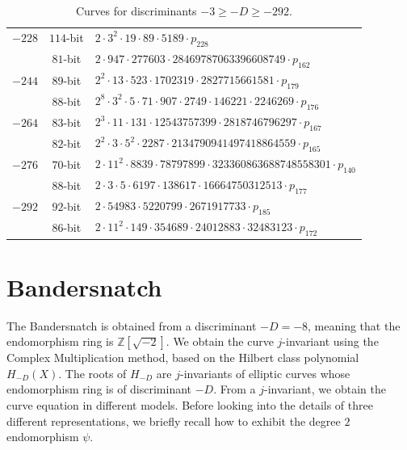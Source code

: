 \documentclass{article}
\newcommand{\Z}{\ensuremath{\mathbb Z}}
\theoremstyle{definition}
\begin{document}
\begin{table}[!ht]
\begin{tabularx}{\textwidth}{ccl}
$-228$ & $114$-bit & $2  \cdot 3^{2}  \cdot 19  \cdot 89  \cdot 5189  \cdot p_{228}$\\
 & $81$-bit & $2  \cdot 947  \cdot 277603  \cdot 28469787063396608749  \cdot p_{162}$\\
$-244$ & $89$-bit & $2^{2}  \cdot 13  \cdot 523  \cdot 1702319  \cdot 2827715661581  \cdot p_{179}$\\
 & $88$-bit & $2^{8}  \cdot 3^{2}  \cdot 5  \cdot 71  \cdot 907  \cdot 2749  \cdot 146221  \cdot 2246269  \cdot p_{176}$\\
$-264$ & $83$-bit & $2^{3}  \cdot 11  \cdot 131  \cdot 12543757399  \cdot 2818746796297  \cdot p_{167}$\\
 & $82$-bit & $2^{2}  \cdot 3  \cdot 5^{2}  \cdot 2287  \cdot 2134790941497418864559  \cdot p_{165}$\\
$-276$ & $70$-bit & $2  \cdot 11^{2}  \cdot 8839  \cdot 78797899  \cdot 323360863688748558301  \cdot p_{140}$\\
 & $88$-bit & $2  \cdot 3  \cdot 5  \cdot 6197  \cdot 138617  \cdot 16664750312513  \cdot p_{177}$\\
$-292$ & $92$-bit & $2  \cdot 54983  \cdot 5220799  \cdot 2671917733  \cdot p_{185}$\\
 & $86$-bit & $2  \cdot 11^{2}  \cdot 149  \cdot 354689  \cdot
24012883  \cdot 32483123  \cdot p_{172}$\\
\bottomrule
    \end{tabularx}
    \caption{Curves for discriminants $-3 \geq -D \geq -292$.}
    \label{tab:group-order-factorization}
\end{table}

\section{Bandersnatch}\label{sec:bandersnatch}

The Bandersnatch is obtained from a discriminant $-D = -8$, meaning
that the endomorphism ring is $\Z[\sqrt{-2}]$.
We obtain the curve $j$-invariant using the Complex Multiplication
method, based on the Hilbert class polynomial $H_{-D}(X)$.
The roots of $H_{-D}$ are $j$-invariants of elliptic curves whose
endomorphism ring is of discriminant $-D$.
From a $j$-invariant, we obtain the curve equation in different
models. Before looking into the details of three different representations,
we briefly recall how to exhibit the degree $2$ endomorphism $\psi$.
\end{document}
